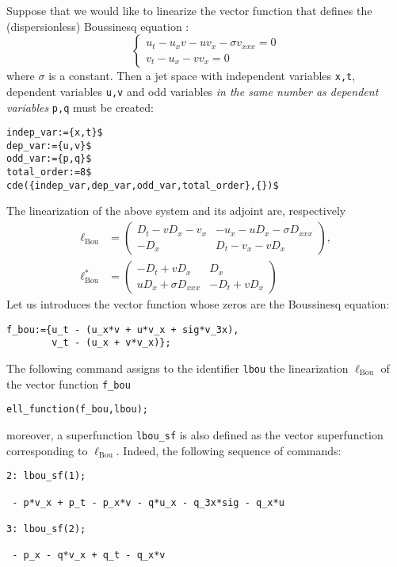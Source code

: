Suppose that we would like to linearize the vector function that defines the
(dispersionless) Boussinesq equation \cite{KerstenKrasilshchikVerboretsky:2006}:
\begin{equation}
  \label{cdeeq:1}
  \left\{
  \begin{array}{l}
  u_t-u_xv-uv_x-\sigma v_{xxx}=0\\
  v_t-u_x-vv_x=0
\end{array}
\right.
\end{equation}
where $\sigma$ is a constant. Then a jet space with independent variables
\texttt{x,t}, dependent variables \texttt{u,v} and odd variables \emph{in the
  same number as dependent variables} \texttt{p,q} must be created:
\begin{verbatim}
indep_var:={x,t}$
dep_var:={u,v}$
odd_var:={p,q}$
total_order:=8$
cde({indep_var,dep_var,odd_var,total_order},{})$
\end{verbatim}
The linearization of the above system and its adjoint are, respectively
\begin{align*}
  \ell_{\text{Bou}}&=
  \begin{pmatrix}
    D_t-vD_x-v_x & -u_x-uD_x-\sigma D_{xxx}\\
    -D_x & D_t-v_x-vD_x
  \end{pmatrix},\\
  \ell^*_{\text{Bou}}&=
  \begin{pmatrix}
    -D_t+vD_x & D_x\\
    uD_x+\sigma D_{xxx} & -D_t+vD_x
  \end{pmatrix}
\end{align*}
Let us introduces the vector function whose zeros are the Boussinesq equation:
\begin{verbatim}
f_bou:={u_t - (u_x*v + u*v_x + sig*v_3x),
        v_t - (u_x + v*v_x)};
\end{verbatim}
The following command assigns to the identifier \texttt{lbou} the linearization
\cdiffop $\ell_{\text{Bou}}$ of the vector function \texttt{f\_bou}
\begin{verbatim}
ell_function(f_bou,lbou);
\end{verbatim}
moreover, a superfunction \texttt{lbou\_sf} is also defined as the vector
superfunction corresponding to $\ell_{\text{Bou}}$.
Indeed, the following sequence of commands:
\begin{verbatim}
2: lbou_sf(1);

 - p*v_x + p_t - p_x*v - q*u_x - q_3x*sig - q_x*u

3: lbou_sf(2);

 - p_x - q*v_x + q_t - q_x*v
\end{verbatim}
